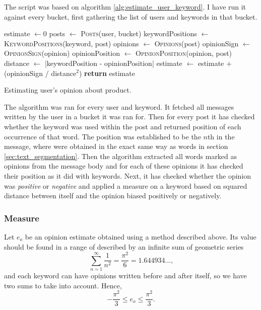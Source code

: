     The script was based on algorithm \ref{alg:estimate_user_keyword}. I have run it against every bucket, first gathering the list of users and keywords in that bucket. 
    \begin{algorithm}[H]
      \begin{algorithmic}[1]
          \State estimate $\gets 0$
          \State posts $\gets$ \textsc{Posts}(user, bucket)
            \State keywordPositions $\gets$ \textsc{KeywordPositions}(keyword, post)
              \State opinions $\gets$ \textsc{Opinions}(post)
                \State opinionSign $\gets$ \textsc{OpinionSign}(opinion)
                \State opinionPosition $\gets$ \textsc{OpinionPosition}(opinion, post)
                \State distance $\gets$ |keywordPosition - opinionPosition|
                \State estimate $\gets$ estimate + (opinionSign / distance$^2$)
              \EndFor
            \EndFor
          \EndFor
          \State \textbf{return} estimate
        \EndProcedure
      \end{algorithmic}
      \caption{Estimating user's opinion about product.}
      \label{alg:estimate_user_keyword}
    \end{algorithm}
    The algorithm was ran for every user and keyword. It fetched all messages written by the user in a bucket it was ran for. Then for every post it has checked whether the keyword was used within the post and returned position of each occurrence of that word. The position was established to be the $n$th  in the message, where  were obtained in the exact same way as words in section \ref{sec:text_segmentation}. Then the algorithm extracted all words marked as opinions from the message body and for each of these opinions it has checked their position as it did with keywords. Next, it has checked whether the opinion was \emph{positive} or \emph{negative} and applied a measure on a keyword based on squared distance between itself and the opinion biased positively or negatively.

    \subsubsection{Measure}

      Let $e_o$ be an opinion estimate obtained using a method described above. Its value should be found in a range of described by an infinite sum of geometric series
      \begin{equation}
        \sum_{n=1}^{\infty} \frac{1}{n^2} = \frac{\pi^2}{6} = 1.644934\ldots \mbox{,}
      \end{equation}
      and each keyword can have opinions written before and after itself, so we have two sums to take into account. Hence,
      \begin{equation}
        -\frac{\pi^2}{3} \leq e_o \leq \frac{\pi^2}{3} \mbox{.}
      \end{equation}
      
